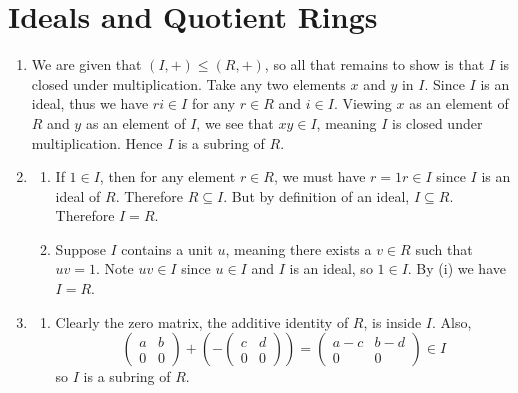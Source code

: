 \section{Ideals and Quotient Rings}
\begin{enumerate}
    \item We are given that $(I, +) \leq (R,+)$, so all that remains to show is that $I$ is closed under multiplication. Take any two elements $x$ and $y$ in $I$. Since $I$ is an ideal, thus we have $ri \in I$ for any $r \in R$ and $i \in I$. Viewing $x$ as an element of $R$ and $y$ as an element of $I$, we see that $xy \in I$, meaning $I$ is closed under multiplication. Hence $I$ is a subring of $R$.
    
    \item \begin{enumerate}[label=(\roman*)]
        \item If $1 \in I$, then for any element $r \in R$, we must have $r = 1r \in I$ since $I$ is an ideal of $R$. Therefore $R \subseteq I$. But by definition of an ideal, $I \subseteq R$. Therefore $I = R$.
        \item Suppose $I$ contains a unit $u$, meaning there exists a $v \in R$ such that $uv = 1$. Note $uv \in I$ since $u \in I$ and $I$ is an ideal, so $1 \in I$. By (i) we have $I = R$.
    \end{enumerate}
    
    \item \begin{enumerate}[label=(\roman*)]
        \item Clearly the zero matrix, the additive identity of $R$, is inside $I$. Also,
        \[
            \begin{pmatrix}a&b\\0&0\end{pmatrix} + (-\begin{pmatrix}c&d\\0&0\end{pmatrix}) = \begin{pmatrix}a-c&b-d\\0&0\end{pmatrix} \in I
        \]
        so $I$ is a subring of $R$.


\end{enumerate}
\end{enumerate}
